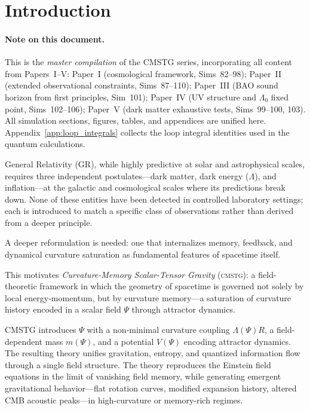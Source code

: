 \documentclass[12pt,a4paper]{article}
\newcommand{\CMSTG}{\textsc{cmstg}}
\begin{document}
\tableofcontents
\newpage

\section{Introduction}
\label{sec:intro}

\paragraph{Note on this document.}
This is the \emph{master compilation} of the CMSTG series, incorporating
all content from Papers~I--V\@:
Paper~I (cosmological framework, Sims~82--98);
Paper~II (extended observational constraints, Sims~87--110);
Paper~III (BAO sound horizon from first principles, Sim~101);
Paper~IV (UV structure and $\Lambda_0$ fixed point, Sims~102--106);
Paper~V (dark matter exhaustive tests, Sims~99--100, 103).
All simulation sections, figures, tables, and appendices are unified here.
Appendix~\ref{app:loop_integrals} collects the loop integral identities
used in the quantum calculations.

General Relativity (GR), while highly predictive at solar and
astrophysical scales, requires three independent postulates---dark
matter, dark energy ($\Lambda$), and inflation---at the galactic and
cosmological scales where its predictions break down. None of these
entities have been detected in controlled laboratory settings; each
is introduced to match a specific class of observations rather than
derived from a deeper principle.

A deeper reformulation is needed: one that internalizes memory, feedback,
and dynamical curvature saturation as fundamental features of spacetime
itself.

This motivates \emph{Curvature-Memory Scalar-Tensor Gravity} (\CMSTG):
a field-theoretic framework in which the geometry of spacetime is
governed not solely by local energy-momentum, but by curvature memory---a
saturation of curvature history encoded in a scalar field $\Psi$ through
attractor dynamics.

CMSTG introduces $\Psi$ with a non-minimal curvature coupling $\Lambda(\Psi)R$,
a field-dependent mass $m(\Psi)$, and a potential $V(\Psi)$ encoding
attractor dynamics. The resulting theory unifies gravitation, entropy,
and quantized information flow through a single field structure. The
theory reproduces the Einstein field equations in the limit of vanishing
field memory, while generating emergent gravitational behavior---flat
rotation curves, modified expansion history, altered CMB acoustic
peaks---in high-curvature or memory-rich regimes.
\end{document}
